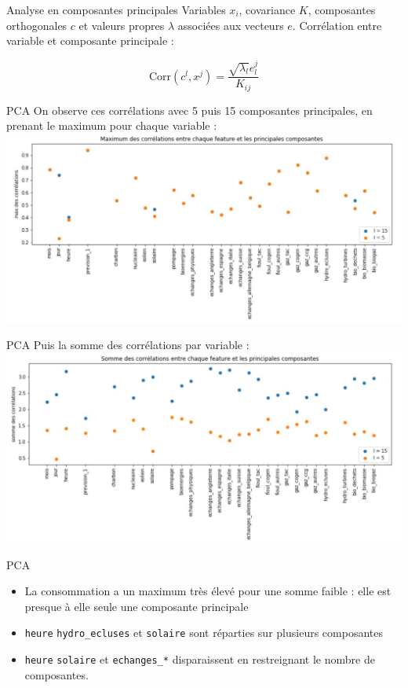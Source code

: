 \begin{frame}{Analyse en composantes principales}
\protect\hypertarget{analyse-en-composantes-principales}{}
Variables \(x_i\), covariance \(K\), composantes orthogonales \(c\) et
valeurs propres \(\lambda\) associées aux vecteurs \(e\). Corrélation
entre variable et composante principale :

\begin{equation}
\text{Corr}(c^l, x^j) = \frac{\sqrt{\lambda_l}e_l^j}{K_{ij}}
\end{equation}
\end{frame}

\begin{frame}{PCA}
\protect\hypertarget{pca}{}
On observe ces corrélations avec 5 puis 15 composantes principales, en
prenant le maximum pour chaque variable :
\includegraphics[scale=.5]{figures/max_pca.JPG}
\end{frame}

\begin{frame}{PCA}
\protect\hypertarget{pca-1}{}
Puis la somme des corrélations par variable :
\includegraphics[scale=.5]{figures/sum_pca.JPG}
\end{frame}

\begin{frame}[fragile]{PCA}
\protect\hypertarget{pca-2}{}
\begin{itemize}
\tightlist
\item
  La consommation a un maximum très élevé pour une somme faible : elle
  est presque à elle seule une composante principale
\item
  \texttt{heure} \texttt{hydro\_ecluses} et \texttt{solaire} sont
  réparties sur plusieurs composantes
\item
  \texttt{heure} \texttt{solaire} et \texttt{echanges\_*} disparaissent
  en restreignant le nombre de composantes.
\end{itemize}
\end{frame}


